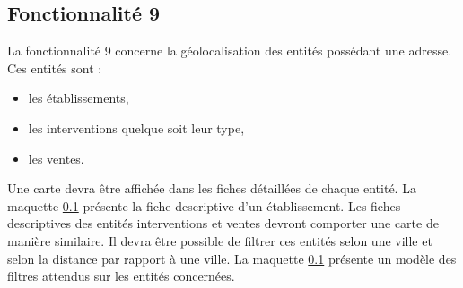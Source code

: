 \subsection{Fonctionnalité 9}

La fonctionnalité 9 concerne la géolocalisation des entités possédant une adresse.
Ces entités sont : 
\begin{itemize}
\item les établissements,
\item les interventions quelque soit leur type,
\item les ventes.
\end{itemize}
Une carte devra être affichée dans les fiches détaillées de chaque entité.
La maquette \ref{} présente la fiche descriptive d'un établissement. Les fiches descriptives
des entités interventions et ventes devront comporter une carte de manière similaire.
Il devra être possible de filtrer ces entités selon une ville et selon la distance par rapport à une ville.
La maquette \ref{} présente un modèle des filtres attendus sur les entités concernées.


